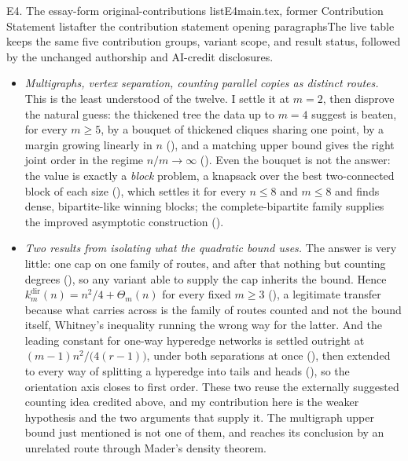 \begin{offcut}{E4. The essay-form original-contributions list}{E4}{main.tex, former Contribution Statement list}{after the contribution statement opening paragraphs}{The live table keeps the same five contribution groups, variant scope, and result status, followed by the unchanged authorship and AI-credit disclosures.}
\begin{itemize}
  \item \emph{Multigraphs, vertex separation, counting parallel copies as distinct routes.} This is the least understood of the twelve. I settle it at $m = 2$, then disprove the natural guess: the thickened tree the data up to $m = 4$ suggest is beaten, for every $m \ge 5$, by a bouquet of thickened cliques sharing one point, by a margin growing linearly in $n$ (), and a matching upper bound gives the right joint order in the regime $n/m \to \infty$ (). Even the bouquet is not the answer: the value is exactly a \emph{block} problem, a knapsack over the best two-connected block of each size (), which settles it for every $n \le 8$ and $m \le 8$ and finds dense, bipartite-like winning blocks; the complete-bipartite family supplies the improved asymptotic construction ().

  \item \emph{Two results from isolating what the quadratic bound uses.} The answer is very little: one cap on one family of routes, and after that nothing but counting degrees (), so any variant able to supply the cap inherits the bound. Hence $k_m^{\mathrm{dir}}(n) = n^2/4 + \Theta_m(n)$ for every fixed $m \ge 3$ (), a legitimate transfer because what carries across is the family of routes counted and not the bound itself, Whitney's inequality running the wrong way for the latter. And the leading constant for one-way hyperedge networks is settled outright at $(m-1)n^2/\bigl(4(r-1)\bigr)$, under both separations at once (), then extended to every way of splitting a hyperedge into tails and heads (), so the orientation axis closes to first order. These two reuse the externally suggested counting idea credited above, and my contribution here is the weaker hypothesis and the two arguments that supply it. The multigraph upper bound just mentioned is not one of them, and reaches its conclusion by an unrelated route through Mader's density theorem.
\end{itemize}
\end{offcut}

